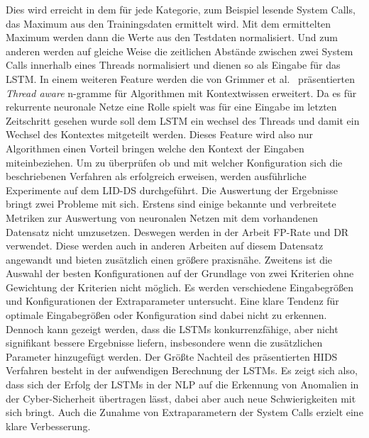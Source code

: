 Dies wird erreicht in dem für jede Kategorie, zum Beispiel lesende System Calls, das Maximum aus den Trainingsdaten ermittelt wird.
Mit dem ermittelten Maximum werden dann die Werte aus den Testdaten normalisiert.
Und zum anderen werden auf gleiche Weise die zeitlichen Abstände zwischen zwei System Calls innerhalb eines Threads normalisiert und dienen so als Eingabe für das \ac{LSTM}.
In einem weiteren Feature werden die von Grimmer et al.~\cite{IDSTHREADGRIMMER2021} präsentierten \textit{Thread aware} n-gramme für Algorithmen mit Kontextwissen erweitert.
Da es für rekurrente neuronale Netze eine Rolle spielt was für eine Eingabe im letzten Zeitschritt gesehen wurde soll dem \ac{LSTM} ein wechsel des Threads und damit ein Wechsel des Kontextes mitgeteilt werden.
Dieses Feature wird also nur Algorithmen einen Vorteil bringen welche den Kontext der Eingaben miteinbeziehen.
Um zu überprüfen ob und mit welcher Konfiguration sich die beschriebenen Verfahren als erfolgreich erweisen, werden ausführliche Experimente auf dem \ac{LID-DS} durchgeführt.
Die Auswertung der Ergebnisse bringt zwei Probleme mit sich.
Erstens sind einige bekannte und verbreitete Metriken zur Auswertung von neuronalen Netzen mit dem vorhandenen Datensatz nicht umzusetzen.
Deswegen werden in der Arbeit \ac{FP}-Rate und \ac{DR} verwendet. 
Diese werden auch in anderen Arbeiten auf diesem Datensatz angewandt und bieten zusätzlich einen größere praxisnähe.
Zweitens ist die Auswahl der besten Konfigurationen auf der Grundlage von zwei Kriterien ohne Gewichtung der Kriterien nicht möglich.
Es werden verschiedene Eingabegrößen und Konfigurationen der Extraparameter untersucht.
Eine klare Tendenz für optimale Eingabegrößen oder Konfiguration sind dabei nicht zu erkennen.
Dennoch kann gezeigt werden, dass die \acp{LSTM} konkurrenzfähige, aber nicht signifikant bessere Ergebnisse liefern, insbesondere wenn die zusätzlichen Parameter hinzugefügt werden.
Der Größte Nachteil des präsentierten \ac{HIDS} Verfahren besteht in der aufwendigen Berechnung der \acp{LSTM}.
Es zeigt sich also, dass sich der Erfolg der \acp{LSTM} in der \ac{NLP} auf die Erkennung von Anomalien in der Cyber-Sicherheit übertragen lässt, dabei aber auch neue Schwierigkeiten mit sich bringt.
Auch die Zunahme von Extraparametern der System Calls erzielt eine klare Verbesserung.

